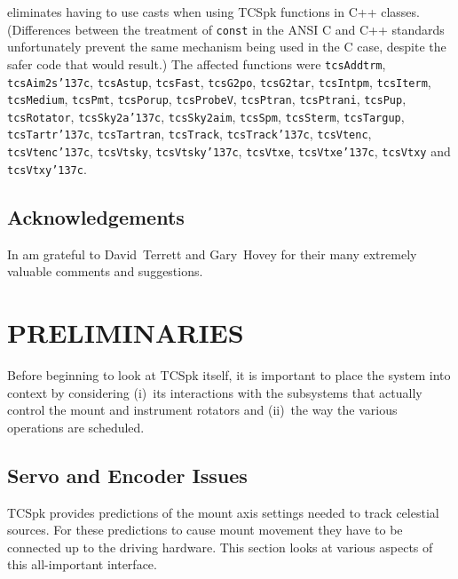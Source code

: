 \documentclass[12pt,fleqn,twoside]{article}
\renewcommand{\_}{{\tt\char'137}}     %
\begin{document}
\begin{itemize}
      eliminates having to use casts when using TCSpk functions in C++
      classes.  (Differences between the treatment of
      {\tt const} in the ANSI C and C++ standards unfortunately
      prevent the same mechanism being used in the C case, despite the
      safer code that would result.)
      The affected functions were
      {\tt tcsAddtrm},
      {\tt tcsAim2s\_c},
      {\tt tcsAstup},
      {\tt tcsFast},
      {\tt tcsG2po},
      {\tt tcsG2tar},
      {\tt tcsIntpm},
      {\tt tcsIterm},
      {\tt tcsMedium},
      {\tt tcsPmt},
      {\tt tcsPorup},
      {\tt tcsProbeV},
      {\tt tcsPtran},
      {\tt tcsPtrani},
      {\tt tcsPup},
      {\tt tcsRotator},
      {\tt tcsSky2a\_c},
      {\tt tcsSky2aim},
      {\tt tcsSpm},
      {\tt tcsSterm},
      {\tt tcsTargup},
      {\tt tcsTartr\_c},
      {\tt tcsTartran},
      {\tt tcsTrack},
      {\tt tcsTrack\_c},
      {\tt tcsVtenc},
      {\tt tcsVtenc\_c},
      {\tt tcsVtsky},
      {\tt tcsVtsky\_c},
      {\tt tcsVtxe},
      {\tt tcsVtxe\_c},
      {\tt tcsVtxy} and
      {\tt tcsVtxy\_c}.
\end{itemize}

\subsection{Acknowledgements}

In am grateful to David~Terrett and Gary~Hovey for their many
extremely valuable comments and suggestions.
\fi

\newpage
\section{PRELIMINARIES}

Before beginning to look at TCSpk itself, it is important to place the
system into context by considering (i)~its interactions with the
subsystems that actually control the mount and instrument rotators
and (ii)~the way the various operations are scheduled.

\subsection{Servo and Encoder Issues}

TCSpk provides predictions of the mount axis settings needed to track
celestial sources.  For these predictions to cause mount movement they
have to be connected up to the driving hardware.  This section looks at
various aspects of this all-important interface.
\end{document}
